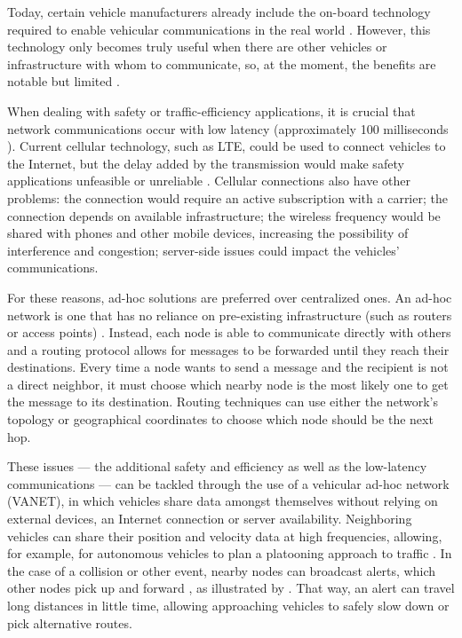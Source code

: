 Today, certain vehicle manufacturers already include the on-board technology required to enable vehicular communications in the real world \citep{toyota2015}.
However, this technology only becomes truly useful when there are other vehicles or infrastructure with whom to communicate, so, at the moment, the benefits are notable but limited \citep{cadillac2017}.

When dealing with safety or traffic-efficiency applications, it is crucial that network communications occur with low latency (approximately 100 milliseconds \citep{camp2005vehicle}).
Current cellular technology, such as LTE, could be used to connect vehicles to the Internet, but the delay added by the transmission would make safety applications unfeasible or unreliable \citep{mangel2010comparison}.
Cellular connections also have other problems: the connection would require an active subscription with a carrier; the connection depends on available infrastructure; the wireless frequency would be shared with phones and other mobile devices, increasing the possibility of interference and congestion; server-side issues could impact the vehicles' communications.

For these reasons, ad-hoc solutions are preferred over centralized ones.
An ad-hoc network is one that has no reliance on pre-existing infrastructure (such as routers or access points) \citep{wu2004ad}.
Instead, each node is able to communicate directly with others and a routing protocol allows for messages to be forwarded until they reach their destinations.
Every time a node wants to send a message and the recipient is not a direct neighbor, it must choose which nearby node is the most likely one to get the message to its destination.
Routing techniques can use either the network's topology or geographical coordinates \citep{saini2015close} to choose which node should be the next hop.

These issues — the additional safety and efficiency as well as the low-latency communications — can be tackled through the use of a vehicular ad-hoc network (VANET), in which vehicles share data amongst themselves without relying on external devices, an Internet connection or server availability.
Neighboring vehicles can share their position and velocity data at high frequencies, allowing, for example, for autonomous vehicles to plan a platooning approach to traffic \citep{amoozadeh2015platoon}.
In the case of a collision or other event, nearby nodes can broadcast alerts, which other nodes pick up and forward \citep{li2007routing}, as illustrated by .
That way, an alert can travel long distances in little time, allowing approaching vehicles to safely slow down or pick alternative routes.

